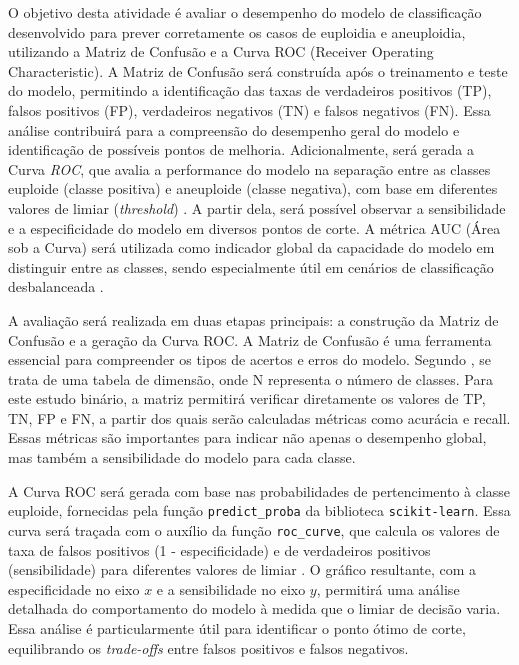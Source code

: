 O objetivo desta atividade é avaliar o desempenho do modelo de classificação desenvolvido para prever corretamente os casos de euploidia e aneuploidia, utilizando a Matriz de Confusão e a Curva ROC (Receiver Operating Characteristic). A Matriz de Confusão será construída após o treinamento e teste do modelo, permitindo a identificação das taxas de verdadeiros positivos (TP), falsos positivos (FP), verdadeiros negativos (TN) e falsos negativos (FN). Essa análise contribuirá para a compreensão do desempenho geral do modelo e identificação de possíveis pontos de melhoria. Adicionalmente, será gerada a Curva \textit{ROC}, que avalia a performance do modelo na separação entre as classes euploide (classe positiva) e aneuploide (classe negativa), com base em diferentes valores de limiar (\textit{threshold}) \cite{vilela2022}. A partir dela, será possível observar a sensibilidade e a especificidade do modelo em diversos pontos de corte. A métrica AUC (Área sob a Curva) será utilizada como indicador global da capacidade do modelo em distinguir entre as classes, sendo especialmente útil em cenários de classificação desbalanceada \cite{vilela2022}.

A avaliação será realizada em duas etapas principais: a construção da Matriz de Confusão e a geração da Curva ROC. A Matriz de Confusão é uma ferramenta essencial para compreender os tipos de acertos e erros do modelo. Segundo , se trata de uma tabela de dimensão, onde N representa o número de classes. Para este estudo binário, a matriz permitirá verificar diretamente os valores de TP, TN, FP e FN, a partir dos quais serão calculadas métricas como acurácia e recall. Essas métricas são importantes para indicar não apenas o desempenho global, mas também a sensibilidade do modelo para cada classe.

A Curva ROC será gerada com base nas probabilidades de pertencimento à classe euploide, fornecidas pela função \texttt{predict\_proba} da biblioteca \texttt{scikit-learn}. Essa curva será traçada com o auxílio da função \texttt{roc\_curve}, que calcula os valores de taxa de falsos positivos (1 - especificidade) e de verdadeiros positivos (sensibilidade) para diferentes valores de limiar \cite{vilela2022}. O gráfico resultante, com a especificidade no eixo \(x\) e a sensibilidade no eixo \(y\), permitirá uma análise detalhada do comportamento do modelo à medida que o limiar de decisão varia. Essa análise é particularmente útil para identificar o ponto ótimo de corte, equilibrando os \textit{trade-offs} entre falsos positivos e falsos negativos.

